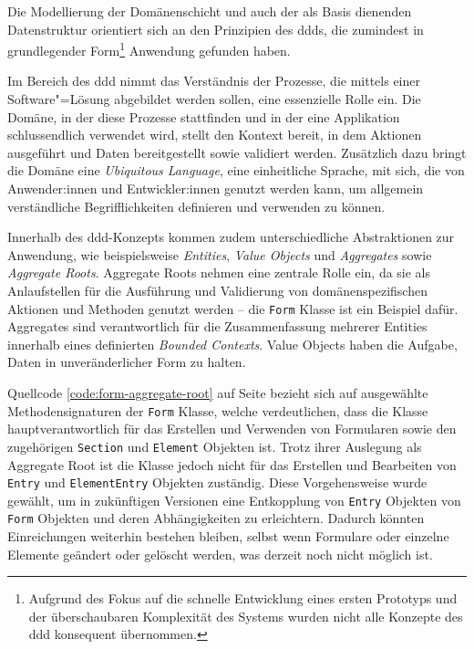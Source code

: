\documentclass[a4paper,12pt,twoside]{scrreprt}
\begin{document}
Die Modellierung der Domänenschicht und auch der als Basis dienenden Datenstruktur orientiert sich an den Prinzipien des \acp{ddd}, die zumindest in grundlegender Form\footnote{Aufgrund des Fokus auf die schnelle Entwicklung eines ersten Prototyps und der überschaubaren Komplexität des Systems wurden nicht alle Konzepte des \ac{ddd} konsequent übernommen.} Anwendung gefunden haben.

Im Bereich des \ac{ddd} nimmt das Verständnis der Prozesse, die mittels einer Software"=Lösung abgebildet werden sollen, eine essenzielle Rolle ein. Die Domäne, in der diese Prozesse stattfinden und in der eine Applikation schlussendlich verwendet wird, stellt den Kontext bereit, in dem Aktionen ausgeführt und Daten bereitgestellt sowie validiert werden. Zusätzlich dazu bringt die Domäne eine \textit{Ubiquitous Language}, eine einheitliche Sprache, mit sich, die von Anwender:innen und Entwickler:innen genutzt werden kann, um allgemein verständliche Begrifflichkeiten definieren und verwenden zu können. \cite{airbrake_technologies_inc_domain-driven_2022, fowler_domaindrivendesign_2020}

Innerhalb des \ac{ddd}-Konzepts kommen zudem unterschiedliche Abstraktionen zur Anwendung, wie beispielsweise \textit{Entities}, \textit{Value Objects} und \textit{Aggregates} sowie \textit{Aggregate Roots}. Aggregate Roots nehmen eine zentrale Rolle ein, da sie als Anlaufstellen für die Ausführung und Validierung von domänenspezifischen Aktionen und Methoden genutzt werden -- die \texttt{Form} Klasse ist ein Beispiel dafür. Aggregates sind verantwortlich für die Zusammenfassung mehrerer Entities innerhalb eines definierten \textit{Bounded Contexts}. Value Objects haben die Aufgabe, Daten in unveränderlicher Form zu halten. \cite{airbrake_technologies_inc_domain-driven_2022, fowler_domaindrivendesign_2020, fowler_ddd_aggregate_2013}

\medskip

Quellcode \ref{code:form-aggregate-root} auf Seite \pageref{code:form-aggregate-root} bezieht sich auf ausgewählte Methodensignaturen der \texttt{Form} Klasse, welche verdeutlichen, dass die Klasse hauptverantwortlich für das Erstellen und Verwenden von Formularen sowie den zugehörigen \texttt{Section} und \texttt{Element} Objekten ist. Trotz ihrer Auslegung als Aggregate Root ist die Klasse jedoch nicht für das Erstellen und Bearbeiten von \texttt{Entry} und \texttt{ElementEntry} Objekten zuständig. Diese Vorgehensweise wurde gewählt, um in zukünftigen Versionen eine Entkopplung von \texttt{Entry} Objekten von \texttt{Form} Objekten und deren Abhängigkeiten zu erleichtern. Dadurch könnten Einreichungen weiterhin bestehen bleiben, selbst wenn Formulare oder einzelne Elemente geändert oder gelöscht werden, was derzeit noch nicht möglich ist.
\end{document}
